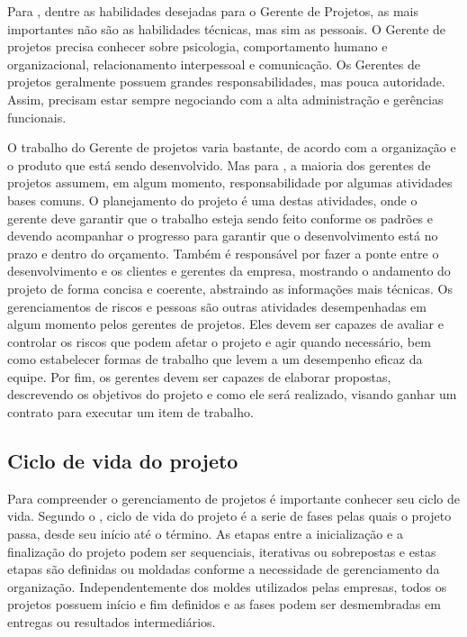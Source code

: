 \documentclass[
    12pt,               %
    openright,          %
    twoside,            %
    a4paper,            %
    chapter=TITLE,     %
    english,            %
    spanish,            %
    portuguese              %
    ]{abntex2}
\begin{document}
Para , dentre as habilidades desejadas para o Gerente de Projetos, as mais importantes não são as habilidades técnicas, mas sim as pessoais. O Gerente de projetos precisa conhecer sobre psicologia, comportamento humano e organizacional, relacionamento interpessoal e comunicação. Os Gerentes de projetos geralmente possuem grandes responsabilidades, mas pouca autoridade. Assim, precisam estar sempre negociando com a alta administração e gerências funcionais.

O trabalho do Gerente de projetos varia bastante, de acordo com a organização e o produto que está sendo desenvolvido. Mas para , a maioria dos gerentes de projetos assumem, em algum momento, responsabilidade por algumas atividades bases comuns. O planejamento do projeto é uma destas atividades, onde o gerente deve garantir que o trabalho esteja sendo feito conforme os padrões e devendo acompanhar o progresso para garantir que o desenvolvimento está no prazo e dentro do orçamento. Também é responsável por fazer a ponte entre o desenvolvimento e os clientes e gerentes da empresa, mostrando o andamento do projeto de forma concisa e coerente, abstraindo as informações mais técnicas. Os gerenciamentos de riscos e pessoas são outras atividades desempenhadas em algum momento pelos gerentes de projetos. Eles devem ser capazes de avaliar e controlar os riscos que podem afetar o projeto e agir quando necessário, bem como estabelecer formas de trabalho que levem a um desempenho eficaz da equipe. Por fim, os gerentes devem ser capazes de elaborar propostas, descrevendo os objetivos do projeto e como ele será realizado, visando ganhar um contrato para executar um item de trabalho.

\subsection{Ciclo de vida do projeto}
Para compreender o gerenciamento de projetos é importante conhecer seu ciclo de vida. Segundo o , ciclo de vida do projeto é a serie de fases pelas quais o projeto passa, desde seu início até o término. As etapas entre a inicialização e a finalização do projeto podem ser sequenciais, iterativas ou sobrepostas e estas etapas são definidas ou moldadas conforme a necessidade de gerenciamento da organização. Independentemente dos moldes utilizados pelas empresas, todos os projetos possuem início e fim definidos e as fases podem ser desmembradas em entregas ou resultados intermediários.
\end{document}
